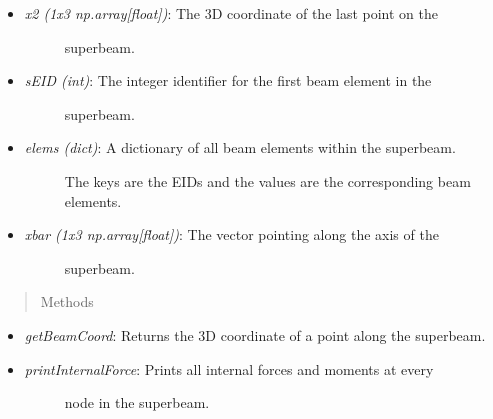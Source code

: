 \documentclass[letterpaper,10pt,english]{sphinxmanual}
\begin{document}
\begin{fulllineitems}
\begin{itemize}
\begin{description}
\end{description}

\item {} \begin{description}
\item[{\emph{x2 (1x3 np.array{[}float{]})}: The 3D coordinate of the last point on the}] \leavevmode
superbeam.

\end{description}

\item {} \begin{description}
\item[{\emph{sEID (int)}: The integer identifier for the first beam element in the}] \leavevmode
superbeam.

\end{description}

\item {} \begin{description}
\item[{\emph{elems (dict)}: A dictionary of all beam elements within the superbeam.}] \leavevmode
The keys are the EIDs and the values are the corresponding beam
elements.

\end{description}

\item {} \begin{description}
\item[{\emph{xbar (1x3 np.array{[}float{]})}: The vector pointing along the axis of the}] \leavevmode
superbeam.

\end{description}

\end{itemize}
\begin{quote}\begin{description}
\item[{Methods}] \leavevmode
\end{description}\end{quote}
\begin{itemize}
\item {} 
\emph{getBeamCoord}: Returns the 3D coordinate of a point along the superbeam.

\item {} \begin{description}
\item[{\emph{printInternalForce}: Prints all internal forces and moments at every}] \leavevmode
node in the superbeam.


\end{description}
\end{itemize}
\end{fulllineitems}
\end{document}
